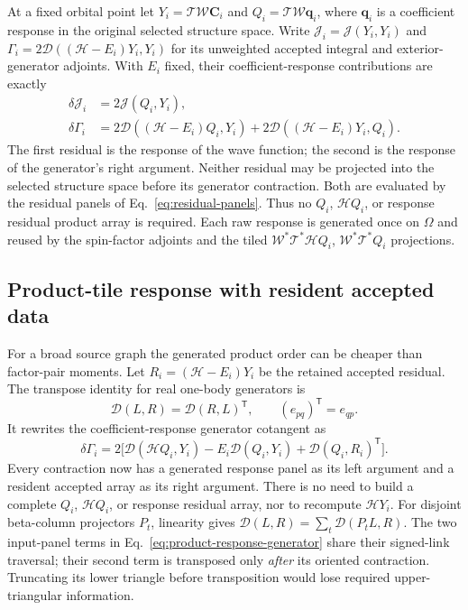 \documentclass[11pt,a4paper]{article}
\newcommand{\Tr}{^{\mathsf T}}
\newcommand{\Wa}{\mathcal W}
\newcommand{\Ta}{\mathcal T}
\newcommand{\Ha}{\mathcal H}
\renewcommand{\vv}[1]{\mathbf{#1}}
\begin{document}
At a fixed orbital point let $Y_i=\Ta\Wa\vv C_i$ and
$Q_i=\Ta\Wa\vv q_i$, where $\vv q_i$ is a coefficient response in
the original selected structure space. Write
$\mathcal J_i=\mathcal J(Y_i,Y_i)$ and
$\Gamma_i=2\mathcal D((\Ha-E_i)Y_i,Y_i)$ for its unweighted accepted
integral and exterior-generator adjoints. With $E_i$ fixed, their
coefficient-response contributions are exactly
\begin{align}\label{eq:factor-structure-response}
 \delta\mathcal J_i&=2\mathcal J(Q_i,Y_i),\\
 \delta\Gamma_i&=2\mathcal D((\Ha-E_i)Q_i,Y_i)
                    +2\mathcal D((\Ha-E_i)Y_i,Q_i).
\end{align}
The first residual is the response of the wave function; the second is the
response of the generator's right argument. Neither residual may be
projected into the selected structure space before its generator contraction.
Both are evaluated by the residual panels of
Eq.~\eqref{eq:residual-panels}. Thus no $Q_i$, $\Ha Q_i$, or response
residual product array is required. Each raw response is generated once
on $\Omega$ and reused by the spin-factor adjoints and the tiled
$\Wa^*\Ta^*\Ha Q_i$, $\Wa^*\Ta^*Q_i$ projections.

\subsection{Product-tile response with resident accepted data}

For a broad source graph the generated product order can be cheaper than
factor-pair moments. Let $R_i=(\Ha-E_i)Y_i$ be the retained accepted residual.
The transpose identity for real one-body generators is
\begin{equation}
 \mathcal D(L,R)=\mathcal D(R,L)\Tr,
 \qquad (e_{pq})\Tr=e_{qp}.
\end{equation}
It rewrites the coefficient-response generator cotangent as
\begin{equation}
 \delta\Gamma_i=2\bigl[
   \mathcal D(\Ha Q_i,Y_i)-E_i\mathcal D(Q_i,Y_i)
   +\mathcal D(Q_i,R_i)\Tr\bigr].
 \label{eq:product-response-generator}
\end{equation}
Every contraction now has a generated response panel as its left argument
and a resident accepted array as its right argument. There is no need to
build a complete $Q_i$, $\Ha Q_i$, or response residual array, nor to
recompute $\Ha Y_i$. For disjoint beta-column projectors $P_t$, linearity
gives $\mathcal D(L,R)=\sum_t\mathcal D(P_tL,R)$. The two input-panel
terms in Eq.~\eqref{eq:product-response-generator} share their signed-link
traversal; their second term is transposed only \emph{after} its oriented
contraction. Truncating its lower triangle before transposition would lose
required upper-triangular information.
\end{document}
